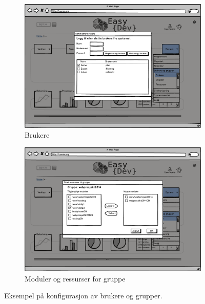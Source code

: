 \begin{figure}[h]
        \vspace*{0.4cm}
       
        \begin{subfigure}[b]{0.48\textwidth}
                \includegraphics[width=\textwidth]
                {./img/prosessdokumentasjon/lowfi/b3.png}
                \caption{Brukere}
                \label{fig:brukere3}
        \end{subfigure}
        \begin{subfigure}[b]{0.48\textwidth}
                \includegraphics[width=\textwidth]
                {./img/prosessdokumentasjon/lowfi/b4.png}
                \caption{Moduler og ressurser for gruppe}
                \label{fig:brukere4}
        \end{subfigure}
        \caption[Konfigurasjon av brukere og grupper]{Eksempel på konfigurasjon av brukere og grupper.}\label{fig:lowfibrukere}
\end{figure}
